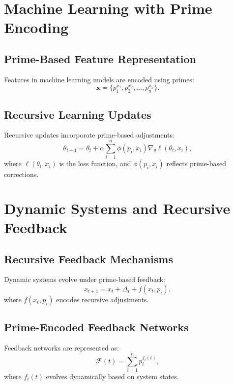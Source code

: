\documentclass{article}
\theoremstyle{plain}
\begin{document}
\section{Machine Learning with Prime Encoding}

\subsection{Prime-Based Feature Representation}
Features in machine learning models are encoded using primes:
\begin{equation}
    \mathbf{x} = \{p_1^{x_1}, p_2^{x_2}, \ldots, p_n^{x_n}\}.
\end{equation}

\subsection{Recursive Learning Updates}
Recursive updates incorporate prime-based adjustments:
\begin{equation}
    \theta_{t+1} = \theta_t + \alpha \sum_{i=1}^n \phi(p_i, x_i) \nabla_\theta \ell(\theta_t, x_i),
\end{equation}
where \(\ell(\theta_t, x_i)\) is the loss function, and \(\phi(p_i, x_i)\) reflects prime-based corrections.

\section{Dynamic Systems and Recursive Feedback}

\subsection{Recursive Feedback Mechanisms}
Dynamic systems evolve under prime-based feedback:
\begin{equation}
    x_{t+1} = x_t + \Delta_t + f(x_t, p_i),
\end{equation}
where \(f(x_t, p_i)\) encodes recursive adjustments.

\subsection{Prime-Encoded Feedback Networks}
Feedback networks are represented as:
\begin{equation}
    \mathcal{F}(t) = \sum_{i=1}^n p_i^{f_i(t)},
\end{equation}
where \(f_i(t)\) evolves dynamically based on system states.
\end{document}
